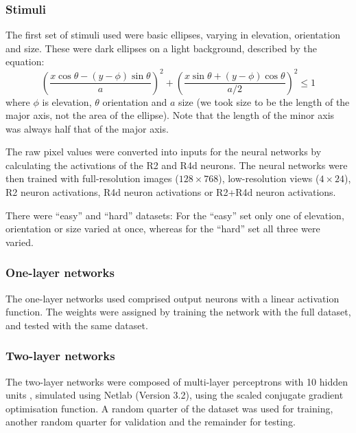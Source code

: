 \documentclass[a4paper,12pt]{article}
\begin{document}
\subsubsection{Stimuli}
The first set of stimuli used were basic ellipses, varying in elevation, orientation and size.
These were dark ellipses on a light background, described by the equation:
$$
\left( \frac{x\cos \theta - (y-\phi)\sin \theta}{a} \right) ^2 + \left( \frac{x\sin \theta + (y-\phi)\cos \theta}{ a / 2} \right) ^2 \le 1
$$
where $\phi$ is elevation, $\theta$ orientation and $a$ size (we took size to be the length of the major axis, not the area of the ellipse).
Note that the length of the minor axis was always half that of the major axis.

The raw pixel values were converted into inputs for the neural networks by calculating the activations of the R2 and R4d neurons.
The neural networks were then trained with full-resolution images ($128\times 768$), low-resolution views ($4\times 24$), R2 neuron activations, R4d neuron activations or R2+R4d neuron activations.

There were ``easy'' and ``hard'' datasets: For the ``easy'' set only one of elevation, orientation or size varied at once, whereas for the ``hard'' set all three were varied.

\subsubsection{One-layer networks}
The one-layer networks used comprised output neurons with a linear activation function.
The weights were assigned by training the network with the full dataset, and tested with the same dataset.

\subsubsection{Two-layer networks}
The two-layer networks were composed of multi-layer perceptrons with 10 hidden units \cite{bishop1995neural}, simulated using Netlab (Version 3.2), using the scaled conjugate gradient optimisation function.
A random quarter of the dataset was used for training, another random quarter for validation and the remainder for testing.



\end{document}
